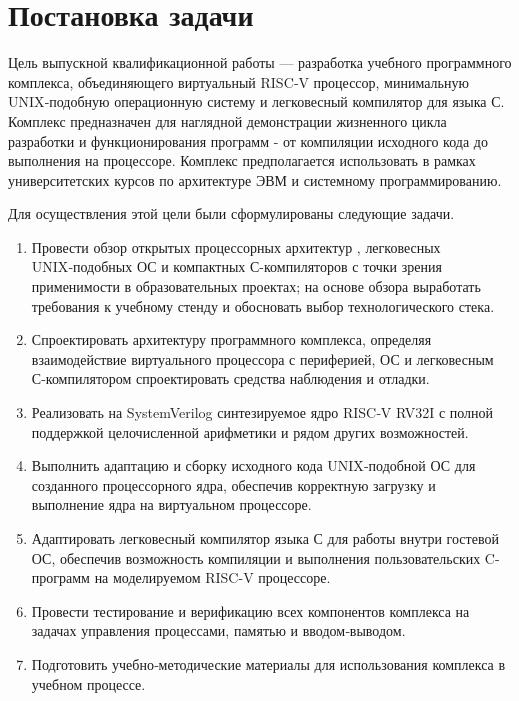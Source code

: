 
\section{Постановка задачи}
\label{sec:task}

Цель выпускной квалификационной работы — разработка учебного программного комплекса, объединяющего виртуальный RISC‑V процессор, минимальную UNIX‑подобную операционную систему и легковесный компилятор для языка С. Комплекс предназначен для наглядной демонстрации жизненного цикла разработки и функционирования программ - от компиляции исходного кода до выполнения на процессоре. Комплекс предполагается использовать в рамках университетских курсов по архитектуре ЭВМ и системному программированию.

Для осуществления этой цели были сформулированы следующие задачи.

\begin{enumerate}
    \item Провести обзор открытых процессорных архитектур , легковесных UNIX‑подобных ОС и компактных С-компиляторов с точки зрения применимости в образовательных проектах; на основе обзора выработать требования к учебному стенду и обосновать выбор технологического стека.
    \item Спроектировать  архитектуру программного комплекса, определяя взаимодействие виртуального процессора с периферией, ОС и легковесным С-компилятором спроектировать средства наблюдения и отладки.
    \item Реализовать на SystemVerilog синтезируемое ядро RISC‑V RV32I с полной поддержкой целочисленной арифметики и рядом других возможностей.
    \item Выполнить адаптацию и сборку исходного кода UNIX‑подобной ОС для созданного процессорного ядра, обеспечив корректную загрузку и выполнение ядра на виртуальном процессоре.
    \item Адаптировать легковесный компилятор языка С для работы внутри гостевой ОС, обеспечив возможность компиляции и выполнения пользовательских C-программ на моделируемом RISC-V процессоре.
    \item Провести тестирование и верификацию всех компонентов комплекса на задачах управления процессами, памятью и вводом‑выводом.
    \item Подготовить учебно‑методические материалы для использования комплекса в учебном процессе.
\end{enumerate}
